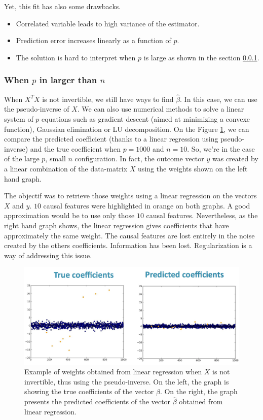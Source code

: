 \documentclass[a4paper,12pt]{article}
\begin{document}
Yet, this fit has also some drawbacks.
\begin{itemize}
\item Correlated variable leads to high variance of the estimator.
\item Prediction error increases linearly as a function of $p$.
\item The solution is hard to interpret when $p$ is large as shown in the section \ref{LargeP}.
\end{itemize}

\subsubsection{When $p$ in larger than $n$}
\label{LargeP}
When $X^T X$ is not invertible, we still have ways to find $\hat{\beta}$. In this case, we can use the pseudo-inverse of $X$. We can also use numerical methods to solve a linear system of $p$ equations such as gradient descent (aimed at minimizing a convexe function), Gaussian elimination or LU decomposition.
On the Figure \ref{LRPseudoInverse}, we can compare the predicted coefficient (thanks to a linear regression using pseudo-inverse) and the true coefficient when $p = 1000$ and $n = 10$. So, we're in the case of the large $p$, small $n$ configuration. In fact, the outcome vector $y$ was created by a linear combination of the data-matrix $X$ using the weights shown on the left hand graph. 

The objectif was to retrieve those weights using a linear regression on the vectors $X$ and $y$. $10$ causal features were highlighted in orange on both graphs. A good approximation would be to use only those $10$ causal features. Nevertheless, as the right hand graph shows, the linear regression gives coefficients that have approximately the same weight. The causal features are lost entirely in the noise created by the others coefficients. Information has been lost. Regularization is a way of addressing this issue.

\begin{figure}[!h]
\centerline{
\includegraphics[scale = 0.3]{Figures/linear_regression_pseudoinverse.png}}
\caption{Example of weights obtained from linear regression when $X$ is not invertible, thus using the pseudo-inverse. On the left, the graph is showing the true coefficients of the vector $\beta$. On the right, the graph presents the predicted coefficients of the vector $\hat{\beta}$ obtained from linear regression.}
\label{LRPseudoInverse}
\end{figure}
\end{document}
